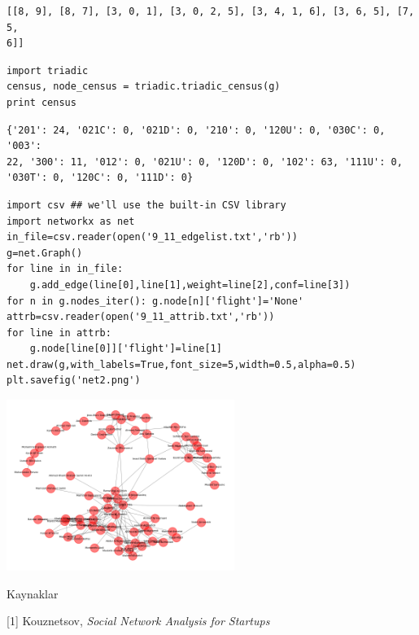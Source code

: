 \documentclass[12pt,fleqn]{article}\usepackage{../../common}
\begin{document}
\begin{verbatim}
[[8, 9], [8, 7], [3, 0, 1], [3, 0, 2, 5], [3, 4, 1, 6], [3, 6, 5], [7, 5,
6]] 
\end{verbatim}


\begin{verbatim}
import triadic
census, node_census = triadic.triadic_census(g)
print census
\end{verbatim}

\begin{verbatim}
{'201': 24, '021C': 0, '021D': 0, '210': 0, '120U': 0, '030C': 0, '003':
22, '300': 11, '012': 0, '021U': 0, '120D': 0, '102': 63, '111U': 0,
'030T': 0, '120C': 0, '111D': 0} 
\end{verbatim}


\begin{verbatim}
import csv ## we'll use the built-in CSV library
import networkx as net
in_file=csv.reader(open('9_11_edgelist.txt','rb'))
g=net.Graph()
for line in in_file:
    g.add_edge(line[0],line[1],weight=line[2],conf=line[3])
for n in g.nodes_iter(): g.node[n]['flight']='None'
attrb=csv.reader(open('9_11_attrib.txt','rb'))
for line in attrb:
    g.node[line[0]]['flight']=line[1]
net.draw(g,with_labels=True,font_size=5,width=0.5,alpha=0.5)
plt.savefig('net2.png')
\end{verbatim}

\includegraphics[width=20em]{net2.png}

Kaynaklar

[1] Kouznetsov, {\em Social Network Analysis for Startups}
\end{document}
